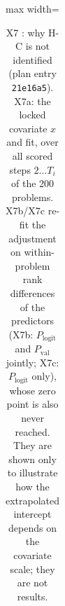 \begin{table}[!htbp]
\begin{adjustbox}{max width=\linewidth}
\begin{tabular}{@{}p{4.1cm}p{2.55cm}p{2.55cm}p{2.55cm}p{2.55cm}@{}}
\bottomrule
\end{tabular}\end{adjustbox}
\caption{X7 \tagE{}: why H-C is not identified (plan entry \texttt{21e16a5}). X7a: the locked covariate $x$ and fit, over all scored steps $2\ldots T_i$ of the 200 problems. X7b/X7c re-fit the adjustment on within-problem rank differences of the predictors (X7b: $P_{\mathrm{logit}}$ and $P_{\mathrm{val}}$ jointly; X7c: $P_{\mathrm{logit}}$ only), whose zero point is also never reached. They are shown only to illustrate how the extrapolated intercept depends on the covariate scale; they are not results.}
\label{tab:x7}
\end{table}
